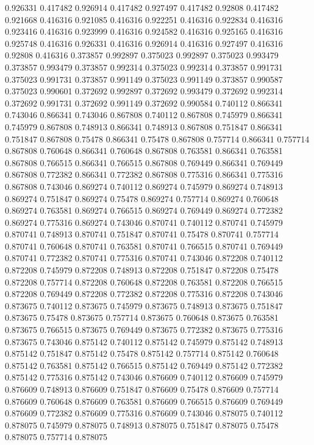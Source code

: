 0.926331 0.417482
0.926914 0.417482
0.927497 0.417482
0.92808 0.417482
0.921668 0.416316
0.921085 0.416316
0.922251 0.416316
0.922834 0.416316
0.923416 0.416316
0.923999 0.416316
0.924582 0.416316
0.925165 0.416316
0.925748 0.416316
0.926331 0.416316
0.926914 0.416316
0.927497 0.416316
0.92808 0.416316
0.373857 0.992897
0.375023 0.992897
0.375023 0.993479
0.373857 0.993479
0.373857 0.992314
0.375023 0.992314
0.373857 0.991731
0.375023 0.991731
0.373857 0.991149
0.375023 0.991149
0.373857 0.990587
0.375023 0.990601
0.372692 0.992897
0.372692 0.993479
0.372692 0.992314
0.372692 0.991731
0.372692 0.991149
0.372692 0.990584
0.740112 0.866341
0.743046 0.866341
0.743046 0.867808
0.740112 0.867808
0.745979 0.866341
0.745979 0.867808
0.748913 0.866341
0.748913 0.867808
0.751847 0.866341
0.751847 0.867808
0.75478 0.866341
0.75478 0.867808
0.757714 0.866341
0.757714 0.867808
0.760648 0.866341
0.760648 0.867808
0.763581 0.866341
0.763581 0.867808
0.766515 0.866341
0.766515 0.867808
0.769449 0.866341
0.769449 0.867808
0.772382 0.866341
0.772382 0.867808
0.775316 0.866341
0.775316 0.867808
0.743046 0.869274
0.740112 0.869274
0.745979 0.869274
0.748913 0.869274
0.751847 0.869274
0.75478 0.869274
0.757714 0.869274
0.760648 0.869274
0.763581 0.869274
0.766515 0.869274
0.769449 0.869274
0.772382 0.869274
0.775316 0.869274
0.743046 0.870741
0.740112 0.870741
0.745979 0.870741
0.748913 0.870741
0.751847 0.870741
0.75478 0.870741
0.757714 0.870741
0.760648 0.870741
0.763581 0.870741
0.766515 0.870741
0.769449 0.870741
0.772382 0.870741
0.775316 0.870741
0.743046 0.872208
0.740112 0.872208
0.745979 0.872208
0.748913 0.872208
0.751847 0.872208
0.75478 0.872208
0.757714 0.872208
0.760648 0.872208
0.763581 0.872208
0.766515 0.872208
0.769449 0.872208
0.772382 0.872208
0.775316 0.872208
0.743046 0.873675
0.740112 0.873675
0.745979 0.873675
0.748913 0.873675
0.751847 0.873675
0.75478 0.873675
0.757714 0.873675
0.760648 0.873675
0.763581 0.873675
0.766515 0.873675
0.769449 0.873675
0.772382 0.873675
0.775316 0.873675
0.743046 0.875142
0.740112 0.875142
0.745979 0.875142
0.748913 0.875142
0.751847 0.875142
0.75478 0.875142
0.757714 0.875142
0.760648 0.875142
0.763581 0.875142
0.766515 0.875142
0.769449 0.875142
0.772382 0.875142
0.775316 0.875142
0.743046 0.876609
0.740112 0.876609
0.745979 0.876609
0.748913 0.876609
0.751847 0.876609
0.75478 0.876609
0.757714 0.876609
0.760648 0.876609
0.763581 0.876609
0.766515 0.876609
0.769449 0.876609
0.772382 0.876609
0.775316 0.876609
0.743046 0.878075
0.740112 0.878075
0.745979 0.878075
0.748913 0.878075
0.751847 0.878075
0.75478 0.878075
0.757714 0.878075
